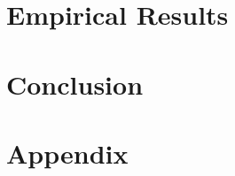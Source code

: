 \documentclass[12pt, oneside, letterpaper]{report}
\begin{document}
\section{Empirical Results}
\label{sec:p2_results}


\section{Conclusion}
\label{sec:p2_conclusion}


\clearpage
\begin{singlespace}

\end{singlespace}

\clearpage
\appendix
\section{Appendix}



\end{document}
